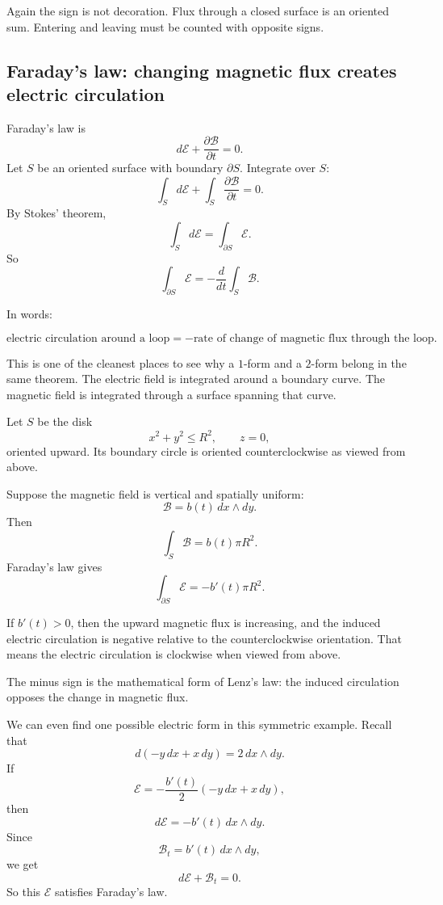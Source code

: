 Again the sign is not decoration.  Flux through a closed surface is an oriented sum.
Entering and leaving must be counted with opposite signs.

\subsection{Faraday's law: changing magnetic flux creates electric circulation}

Faraday's law is
\[
\boxed{
    d\mathcal E+\frac{\partial\mathcal B}{\partial t}=0.
}
\]
Let \(S\) be an oriented surface with boundary \(\partial S\).  Integrate over \(S\):
\[
    \int_S d\mathcal E
    +
    \int_S \frac{\partial\mathcal B}{\partial t}
    =
    0.
\]
By Stokes' theorem,
\[
    \int_S d\mathcal E=\int_{\partial S}\mathcal E.
\]
So
\[
\boxed{
    \int_{\partial S}\mathcal E
    =
    -\frac{d}{dt}\int_S\mathcal B.
}
\]

In words:

\[
\boxed{
    \text{electric circulation around a loop}
    =
    -\text{rate of change of magnetic flux through the loop.}
}
\]

This is one of the cleanest places to see why a \(1\)-form and a \(2\)-form belong in
the same theorem.  The electric field is integrated around a boundary curve.  The
magnetic field is integrated through a surface spanning that curve.

\begin{example}
Let \(S\) be the disk
\[
    x^2+y^2\le R^2,\qquad z=0,
\]
oriented upward.  Its boundary circle is oriented counterclockwise as viewed from
above.

Suppose the magnetic field is vertical and spatially uniform:
\[
    \mathcal B=b(t)\,dx\wedge dy.
\]
Then
\[
    \int_S\mathcal B=b(t)\pi R^2.
\]
Faraday's law gives
\[
\boxed{
    \int_{\partial S}\mathcal E
    =
    -b'(t)\pi R^2.
}
\]

If \(b'(t)>0\), then the upward magnetic flux is increasing, and the induced electric
circulation is negative relative to the counterclockwise orientation.  That means the
electric circulation is clockwise when viewed from above.

The minus sign is the mathematical form of Lenz's law: the induced circulation opposes
the change in magnetic flux.
\end{example}

We can even find one possible electric form in this symmetric example.  Recall that
\[
    d(-y\,dx+x\,dy)=2\,dx\wedge dy.
\]
If
\[
    \mathcal E=-\frac{b'(t)}{2}(-y\,dx+x\,dy),
\]
then
\[
    d\mathcal E=-b'(t)\,dx\wedge dy.
\]
Since
\[
    \mathcal B_t=b'(t)\,dx\wedge dy,
\]
we get
\[
    d\mathcal E+\mathcal B_t=0.
\]
So this \(\mathcal E\) satisfies Faraday's law.

